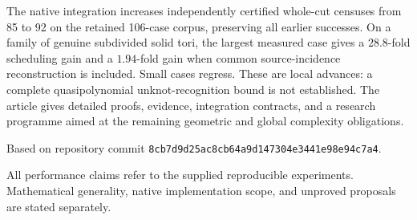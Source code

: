 \documentclass[11pt,letterpaper]{article}
\theoremstyle{definition}
\theoremstyle{remark}
\newcommand{\sourcecommit}{\texttt{8cb7d9d25ac8cb64a9d147304e3441e98e94c7a4}}
\begin{document}
\begin{titlepage}
\begin{minipage}{\textwidth}
The native integration increases independently certified whole-cut censuses
from 85 to 92 on the retained 106-case corpus, preserving all earlier
successes. On a family of genuine subdivided solid tori, the largest measured
case gives a $28.8$-fold scheduling gain and a $1.94$-fold gain when common
source-incidence reconstruction is included. Small cases regress. These are
local advances: a complete quasipolynomial unknot-recognition bound is not
established. The article gives detailed proofs, evidence, integration
contracts, and a research programme aimed at the remaining geometric and
global complexity obligations.
\end{minipage}
\vfill
\noindent\small Based on repository commit \sourcecommit.\par
\noindent\small All performance claims refer to the supplied reproducible
experiments. Mathematical generality, native implementation scope, and
unproved proposals are stated separately.
\end{titlepage}
\hypersetup{pageanchor=true}

\tableofcontents
\newpage









\appendix



\end{document}
